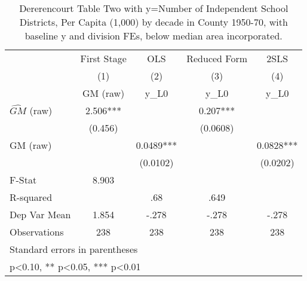 \begin{table}[htbp]\centering
\def\sym#1{\ifmmode^{#1}\else\(^{#1}\)\fi}
\caption{Dererencourt Table Two with y=Number of Independent School Districts, Per Capita (1,000) by decade in County 1950-70, with baseline y and division FEs, below median area incorporated.}
\begin{tabular}{l*{4}{c}}
\toprule
                    & First Stage   &         OLS   &Reduced Form   &        2SLS   \\
                    &\multicolumn{1}{c}{(1)}&\multicolumn{1}{c}{(2)}&\multicolumn{1}{c}{(3)}&\multicolumn{1}{c}{(4)}\\
                    &\multicolumn{1}{c}{GM  (raw)}&\multicolumn{1}{c}{y\_L0}&\multicolumn{1}{c}{y\_L0}&\multicolumn{1}{c}{y\_L0}\\
\midrule
$\hat{GM}$ (raw)    &       2.506***&               &       0.207***&               \\
                    &     (0.456)   &               &    (0.0608)   &               \\
\addlinespace
GM  (raw)           &               &      0.0489***&               &      0.0828***\\
                    &               &    (0.0102)   &               &    (0.0202)   \\
\midrule
F-Stat              &       8.903   &               &               &               \\
R-squared           &               &         .68   &        .649   &               \\
Dep Var Mean        &       1.854   &       -.278   &       -.278   &       -.278   \\
Observations        &         238   &         238   &         238   &         238   \\
\bottomrule
\multicolumn{5}{l}{\footnotesize Standard errors in parentheses}\\
\multicolumn{5}{l}{\footnotesize * p<0.10, ** p<0.05, *** p<0.01}\\
\end{tabular}
\end{table}
